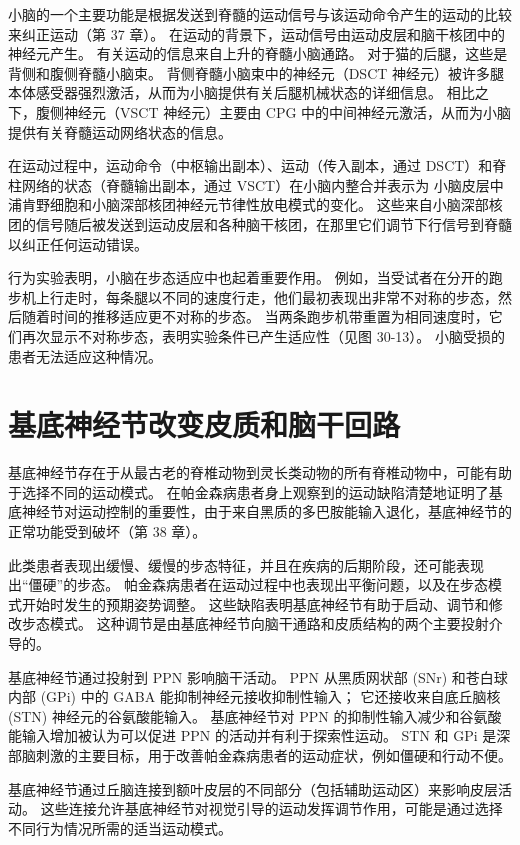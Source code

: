 小脑的一个主要功能是根据发送到脊髓的运动信号与该运动命令产生的运动的比较来纠正运动（第 37 章）。 在运动的背景下，运动信号由运动皮层和脑干核团中的神经元产生。 有关运动的信息来自上升的脊髓小脑通路。 对于猫的后腿，这些是背侧和腹侧脊髓小脑束。 背侧脊髓小脑束中的神经元（DSCT 神经元）被许多腿本体感受器强烈激活，从而为小脑提供有关后腿机械状态的详细信息。 相比之下，腹侧神经元（VSCT 神经元）主要由 CPG 中的中间神经元激活，从而为小脑提供有关脊髓运动网络状态的信息。

在运动过程中，运动命令（中枢输出副本）、运动（传入副本，通过 DSCT）和脊柱网络的状态（脊髓输出副本，通过 VSCT）在小脑内整合并表示为 小脑皮层中浦肯野细胞和小脑深部核团神经元节律性放电模式的变化。 这些来自小脑深部核团的信号随后被发送到运动皮层和各种脑干核团，在那里它们调节下行信号到脊髓以纠正任何运动错误。

行为实验表明，小脑在步态适应中也起着重要作用。 例如，当受试者在分开的跑步机上行走时，每条腿以不同的速度行走，他们最初表现出非常不对称的步态，然后随着时间的推移适应更不对称的步态。 当两条跑步机带重置为相同速度时，它们再次显示不对称步态，表明实验条件已产生适应性（见图 30-13）。 小脑受损的患者无法适应这种情况。

\section{基底神经节改变皮质和脑干回路}
基底神经节存在于从最古老的脊椎动物到灵长类动物的所有脊椎动物中，可能有助于选择不同的运动模式。 在帕金森病患者身上观察到的运动缺陷清楚地证明了基底神经节对运动控制的重要性，由于来自黑质的多巴胺能输入退化，基底神经节的正常功能受到破坏（第 38 章）。

此类患者表现出缓慢、缓慢的步态特征，并且在疾病的后期阶段，还可能表现出“僵硬”的步态。 帕金森病患者在运动过程中也表现出平衡问题，以及在步态模式开始时发生的预期姿势调整。 这些缺陷表明基底神经节有助于启动、调节和修改步态模式。 这种调节是由基底神经节向脑干通路和皮质结构的两个主要投射介导的。

基底神经节通过投射到 PPN 影响脑干活动。 PPN 从黑质网状部 (SNr) 和苍白球内部 (GPi) 中的 GABA 能抑制神经元接收抑制性输入； 它还接收来自底丘脑核 (STN) 神经元的谷氨酸能输入。 基底神经节对 PPN 的抑制性输入减少和谷氨酸能输入增加被认为可以促进 PPN 的活动并有利于探索性运动。 STN 和 GPi 是深部脑刺激的主要目标，用于改善帕金森病患者的运动症状，例如僵硬和行动不便。

基底神经节通过丘脑连接到额叶皮层的不同部分（包括辅助运动区）来影响皮层活动。 这些连接允许基底神经节对视觉引导的运动发挥调节作用，可能是通过选择不同行为情况所需的适当运动模式。


